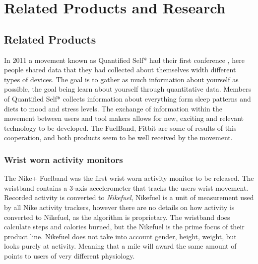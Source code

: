 \chapter{Related Products and Research} %

\label{Chapter3} %


\section{Related Products}
In 2011 a movement known as Quantified Self*\cite{quantfiedSelf} had their first conference \cite{bodyHackers}, here people shared data that they had collected about themselves width different types of devices. The goal is to gather as much information about yourself as possible, the goal being learn about yourself through quantitative data. Members of Quantified Self* collects information about everything form sleep patterns and diets to mood and stress levels.
The exchange of information within the movement between users and tool makers allows for new, exciting and relevant technology to be developed. The FuelBand\cite{fuelBand}, Fitbit\cite{fitBit} are some of results of this cooperation, and both products seem to be well received by the movement. %

\subsection{Wrist worn activity monitors}
The Nike+ Fuelband\cite{fuelBand} was the first wrist worn activity monitor to be released. The wristband contains a 3-axis accelerometer that tracks the users wrist movement. Recorded activity is converted to \emph{Nikefuel}, Nikefuel\cite{nikefuel} is a unit of measurement used by all Nike activity trackers, however there are no details on how activity is converted to Nikefuel, as the algorithm is proprietary. The wristband does calculate steps and calories burned, but the Nikefuel is the prime focus of their product line. Nikefuel does not take into account gender, height, weight, but looks purely at activity. Meaning that a mile will award the same amount of points to users of very different physiology.

